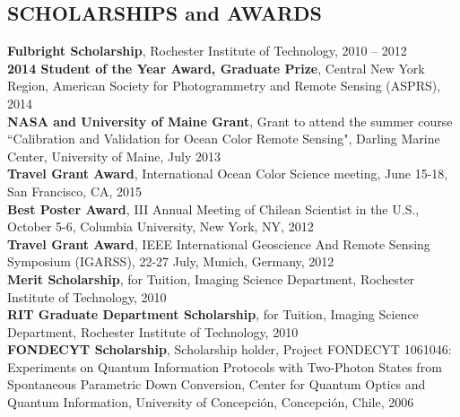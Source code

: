 \documentclass[11pt]{res} %
\begin{document}
\begin{resume}
\section{SCHOLARSHIPS and AWARDS}
\vspace{0.1in}
{\bf Fulbright Scholarship}, Rochester Institute of Technology, 2010 -- 2012
\vspace{0.1in}\\
{\bf 2014 Student of the Year Award, Graduate Prize}, Central New York Region, American Society for Photogrammetry and Remote Sensing (ASPRS), 2014
\vspace{0.1in}\\
{\bf NASA and University of Maine Grant}, Grant to attend the summer course ``Calibration and Validation for Ocean Color Remote Sensing", Darling Marine Center, University of Maine, July 2013
\vspace{0.1in}\\
{\bf Travel Grant Award}, International Ocean Color Science meeting, June 15-18, San Francisco, CA, 2015
\vspace{0.1in}\\
{\bf Best Poster Award}, III Annual Meeting of Chilean Scientist in the U.S., October 5-6, Columbia University, New York, NY, 2012
\vspace{0.1in}\\
{\bf Travel Grant Award}, IEEE International Geoscience And Remote Sensing Symposium (IGARSS), 22-27 July, Munich, Germany, 2012
\vspace{0.1in}\\
{\bf Merit Scholarship}, for Tuition, Imaging Science Department, Rochester Institute of Technology, 2010
\vspace{0.1in}\\
{\bf RIT Graduate Department Scholarship}, for Tuition, Imaging Science Department, Rochester Institute of Technology, 2010
\vspace{0.1in}\\
{\bf FONDECYT Scholarship}, Scholarship holder, Project FONDECYT 1061046: Experiments on Quantum Information Protocols with Two-Photon States from Spontaneous Parametric Down Conversion, Center for Quantum Optics and Quantum Information, University of Concepci\'on, Concepci\'on, Chile, 2006\\

\vspace{-0.1in}

\end{resume}
\end{document}
